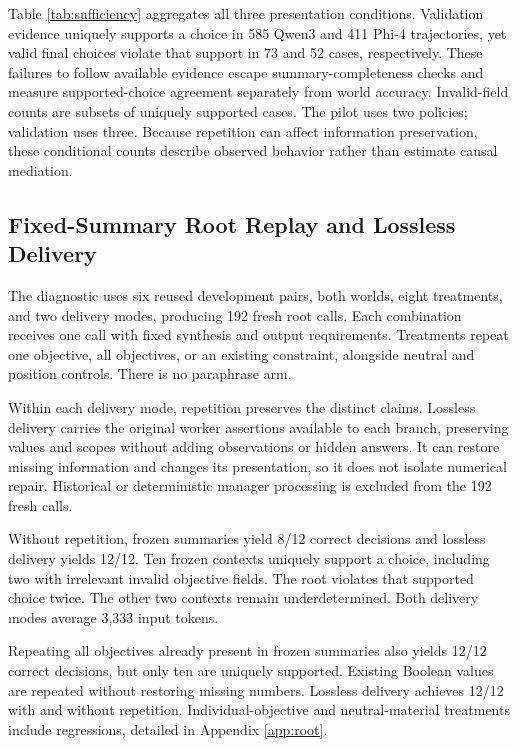 \documentclass{svproc}
\begin{document}
Table \ref{tab:sufficiency} aggregates all three presentation conditions. Validation evidence uniquely supports a choice in 585 Qwen3 and 411 Phi-4 trajectories, yet valid final choices violate that support in 73 and 52 cases, respectively. These failures to follow available evidence escape summary-completeness checks and measure supported-choice agreement separately from world accuracy. Invalid-field counts are subsets of uniquely supported cases. The pilot uses two policies; validation uses three. Because repetition can affect information preservation, these conditional counts describe observed behavior rather than estimate causal mediation.



\subsection{Fixed-Summary Root Replay and Lossless Delivery}
The diagnostic uses six reused development pairs, both worlds, eight treatments,
and two delivery modes, producing 192 fresh root calls. Each combination receives
one call with fixed synthesis and output requirements. Treatments repeat one
objective, all objectives, or an existing constraint, alongside neutral and
position controls. There is no paraphrase arm.

Within each delivery mode, repetition preserves the distinct claims. Lossless
delivery carries the original worker assertions available to each branch,
preserving values and scopes without adding observations or hidden answers.
It can restore missing information and changes its presentation, so it does not
isolate numerical repair. Historical or deterministic manager processing is
excluded from the 192 fresh calls.

Without repetition, frozen summaries yield 8/12 correct decisions and lossless
delivery yields 12/12. Ten frozen contexts uniquely support a choice, including
two with irrelevant invalid objective fields. The root violates that supported
choice twice. The other two contexts remain underdetermined. Both delivery modes
average 3,333 input tokens.

Repeating all objectives already present in frozen summaries also yields 12/12
correct decisions, but only ten are uniquely supported. Existing Boolean values
are repeated without restoring missing numbers. Lossless delivery achieves 12/12
with and without repetition. Individual-objective and neutral-material treatments
include regressions, detailed in Appendix \ref{app:root}.
\end{document}
